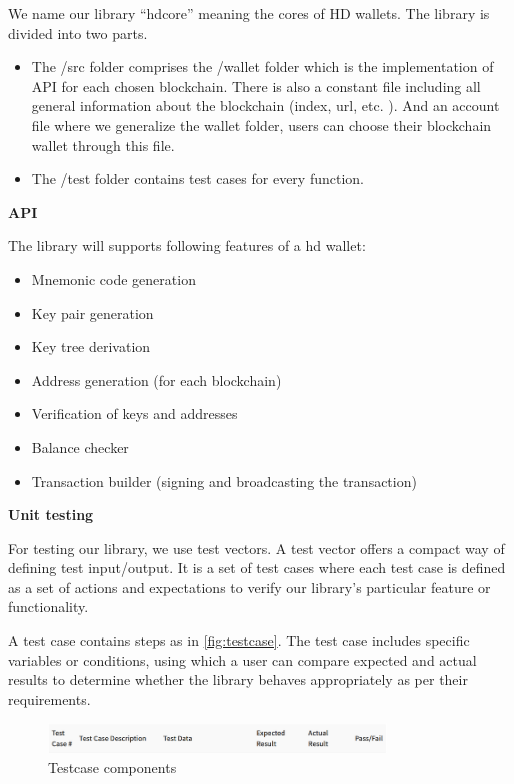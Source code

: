 We name our library “hdcore” meaning the cores of HD wallets. The library is divided into two parts.

\begin{itemize}
    \item The /src folder comprises the /wallet folder which is the implementation of API for each chosen blockchain. There is also a constant file including all general information about the blockchain (index, url, etc. ). And an account file where we generalize the wallet folder, users can choose their blockchain wallet through this file.
    \item The /test folder contains test cases for every function.
\end{itemize}

\bigskip
{\textbf{API}}

The library will supports following features of a hd wallet:

\begin{itemize}
    \item Mnemonic code generation
    \item Key pair generation
    \item Key tree derivation
    \item Address generation (for each blockchain)
    \item Verification of keys and addresses
    \item Balance checker
    \item Transaction builder (signing and broadcasting the transaction)
\end{itemize}


\bigskip
{\textbf{Unit testing}}

For testing our library, we use test vectors. A test vector offers a compact way of defining test input/output. It is a set of test cases where each test case is defined as a set of actions and expectations to verify our library's particular feature or functionality.

A test case contains steps as in \autoref{fig:testcase}. The test case includes specific variables or conditions, using which a user can compare expected and actual results to determine whether the library behaves appropriately as per their requirements.

\begin{figure}[ht!]
    \centering
    \includegraphics[width=0.8\textwidth]{images/testcase.png}
    \caption[Testcase components]{Testcase components}
    \label{fig:testcase}
\end{figure}

